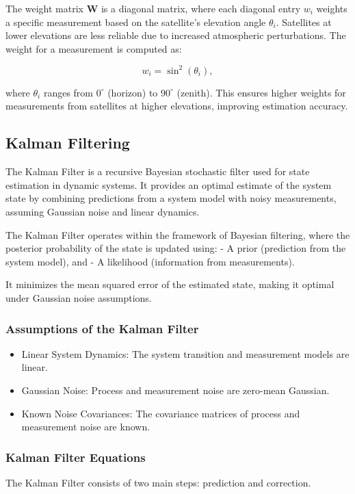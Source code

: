 \documentclass[conference]{IEEEtran}
\begin{document}
The weight matrix \( \mathbf{W} \) is a diagonal matrix, where each diagonal entry \( w_i \) weights a specific measurement based on the satellite's elevation angle \( \theta_i \). Satellites at lower elevations are less reliable due to increased atmospheric perturbations. The weight for a measurement is computed as:

\[
w_i = \sin^2(\theta_i),
\]

where \( \theta_i \) ranges from \( 0^\circ \) (horizon) to \( 90^\circ \) (zenith). This ensures higher weights for measurements from satellites at higher elevations, improving estimation accuracy.

\subsection*{Kalman Filtering}

The Kalman Filter is a recursive Bayesian stochastic filter used for state estimation in dynamic systems. It provides an optimal estimate of the system state by combining predictions from a system model with noisy measurements, assuming Gaussian noise and linear dynamics.

The Kalman Filter operates within the framework of Bayesian filtering, where the posterior probability of the state is updated using:
- A prior (prediction from the system model), and
- A likelihood (information from measurements).

It minimizes the mean squared error of the estimated state, making it optimal under Gaussian noise assumptions.

\subsubsection*{Assumptions of the Kalman Filter}
\begin{itemize}
\item Linear System Dynamics: The system transition and measurement models are linear.
\item Gaussian Noise: Process and measurement noise are zero-mean Gaussian.
\item Known Noise Covariances: The covariance matrices of process and measurement noise are known.
\end{itemize}

\subsubsection*{Kalman Filter Equations}
The Kalman Filter consists of two main steps: prediction and correction.
\end{document}
